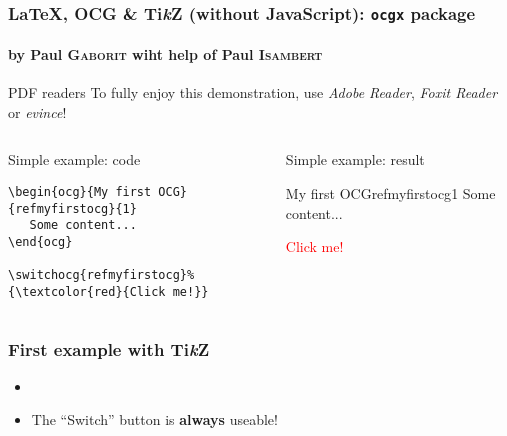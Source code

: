 \documentclass[11pt,hyperref={colorlinks=false,runcolor=blue}]{beamer}
\newcommand\latex{{\rmfamily\LaTeX}}
\newcommand{\TikZ}{Ti\emph{k}Z}
\begin{document}
\begin{frame}[fragile]
  \frametitle{\latex{}, OCG \& \TikZ{}  (without JavaScript): \texttt{ocgx} package}
  \framesubtitle{by Paul \textsc{Gaborit} wiht help of Paul
    \textsc{Isambert}}

  \begin{alertblock}{PDF readers}
    To fully enjoy this demonstration, use \emph{Adobe Reader},
    \emph{Foxit Reader} or \emph{evince}!
  \end{alertblock}

  \begin{columns}


    \begin{block}{Simple example: code}
    \begin{lstlisting}[style=TeXcode]
\begin{ocg}{My first OCG}{refmyfirstocg}{1}
   Some content...
\end{ocg}

\switchocg{refmyfirstocg}%
{\textcolor{red}{Click me!}}
\end{lstlisting}
    \end{block}

    
    \begin{block}{Simple example: result}
      
      \begin{ocg}{My first OCG}{refmyfirstocg}{1}
        Some content...
      \end{ocg}
      
      {\textcolor{red}{Click me!}}
      
    \end{block}
  \end{columns}

\end{frame}

\begin{frame}
  \frametitle{First example with Ti\emph{k}Z}
  
  {\centering
  \par}

  \begin{itemize}
  \item {}
  \item The ``Switch'' button is \textbf{always} useable!
  \end{itemize}
\end{frame}
\end{document}
